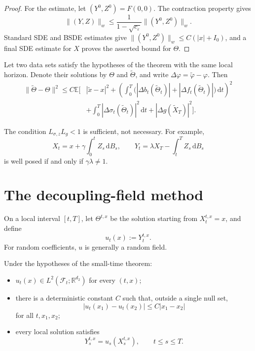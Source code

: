 \begin{proof}
For the estimate, let $(Y^0,Z^0)=F(0,0)$.  The contraction property gives
\[
  \|(Y,Z)\|_w
  \le\frac{1}{1-\sqrt{c_\varepsilon}}
      \|(Y^0,Z^0)\|_w.
\]
Standard SDE and BSDE estimates give
$\|(Y^0,Z^0)\|_w\le C(|x|+I_0)$, and a final SDE estimate for $X$ proves
the asserted bound for $\Theta$.
\end{proof}

\begin{cor}
Let two data sets satisfy the hypotheses of the theorem with the same
local horizon.  Denote their solutions by $\Theta$ and
$\widetilde\Theta$, and write $\Delta\varphi=\widetilde\varphi-\varphi$.
Then
\[
\begin{aligned}
  \|\widetilde\Theta-\Theta\|^2
  \le C\mathbb E\!\Bigg[&|\widetilde x-x|^2
    +\left(\int_0^T
      \bigl(
        |\Delta b_t(\widetilde\Theta_t)|
        +|\Delta f_t(\widetilde\Theta_t)|
      \bigr)\,\mathrm dt\right)^2\\
    &+\int_0^T|\Delta\sigma_t(\widetilde\Theta_t)|^2\,\mathrm dt
    +|\Delta g(\widetilde X_T)|^2
  \Bigg].
\end{aligned}
\]
\end{cor}

\begin{remark}
The condition $L_{\sigma,z}L_g<1$ is sufficient, not necessary.  For
example,
\[
  X_t=x+\gamma\int_0^t Z_s\,\mathrm dB_s,
  \qquad
  Y_t=\lambda X_T-\int_t^T Z_s\,\mathrm dB_s
\]
is well posed if and only if $\gamma\lambda\ne1$.
\end{remark}

\section{The decoupling-field method}

On a local interval $[t,T]$, let $\Theta^{t,x}$ be the solution starting
from $X_t^{t,x}=x$, and define
\[
  u_t(x):=Y_t^{t,x}.
\]
For random coefficients, $u$ is generally a random field.

\begin{thm}
Under the hypotheses of the small-time theorem:
\begin{itemize}
  \item[(i)] $u_t(x)\in L^2(\mathcal F_t;\mathbb R^{d_2})$ for every
  $(t,x)$;
  \item[(ii)] there is a deterministic constant $C$ such that, outside a
  single null set,
  \[
    |u_t(x_1)-u_t(x_2)|\le C|x_1-x_2|
  \]
  for all $t,x_1,x_2$;
  \item[(iii)] every local solution satisfies
  \[
    Y_s^{t,x}=u_s(X_s^{t,x}),
    \qquad t\le s\le T.
  \]
\end{itemize}
\end{thm}


